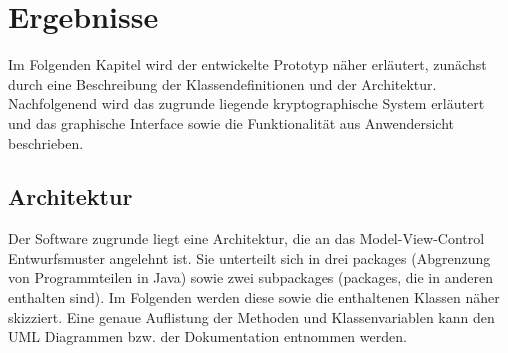 \documentclass[12pt,a4paper,bibliography=totocnumbered,listof=totocnumbered]{scrartcl}
\begin{document}
\pagebreak


\section{Ergebnisse}\label{ErgebnisseV}
Im Folgenden Kapitel wird der entwickelte Prototyp näher erläutert, zunächst durch eine Beschreibung der Klassendefinitionen und der Architektur. Nachfolgenend wird das zugrunde liegende kryptographische System erläutert und das graphische Interface sowie die Funktionalität aus Anwendersicht beschrieben.

\subsection{Architektur}
Der Software zugrunde liegt eine Architektur, die an das Model-View-Control Entwurfsmuster angelehnt ist. Sie unterteilt sich in drei packages (Abgrenzung von Programmteilen in Java) sowie zwei subpackages (packages, die in anderen enthalten sind). Im Folgenden werden diese sowie die enthaltenen Klassen näher skizziert. Eine genaue Auflistung der Methoden und Klassenvariablen kann den UML Diagrammen bzw. der Dokumentation entnommen werden.
\end{document}
